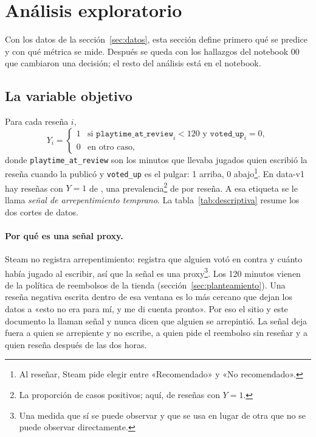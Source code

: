 \section{Análisis exploratorio}\label{sec:exploracion}

Con los datos de la sección~\ref{sec:datos}, esta sección define primero qué se predice y con qué
métrica se mide. Después se queda con los hallazgos del notebook 00 que cambiaron una decisión; el
resto del análisis está en el notebook.

\subsection{La variable objetivo}\label{sec:objetivo}\label{sec:objetivo-formula}

Para cada reseña $i$,
\[
  Y_i =
  \begin{cases}
    1 & \text{si } \texttt{playtime\_at\_review}_i < 120 \text{ y } \texttt{voted\_up}_i = 0,\\
    0 & \text{en otro caso,}
  \end{cases}
\]
donde \texttt{playtime\_at\_review} son los minutos que llevaba jugados quien escribió la reseña
cuando la publicó y \texttt{voted\_up} es el pulgar: 1 arriba, 0 abajo\footnote{Al reseñar, Steam
pide elegir entre «Recomendado» y «No recomendado».}. En data-v1 hay \cifraPositivosEntrenamiento{}
reseñas con $Y = 1$ de \cifraResenasEntrenamiento{}, una prevalencia\footnote{La proporción de
casos positivos; aquí, de reseñas con $Y = 1$.} de \cifraPrevalenciaEntrenamientoPorResena{} por
reseña. A esa etiqueta se le llama \emph{señal de arrepentimiento temprano}. La
tabla~\ref{tab:descriptiva} resume los dos cortes de datos.

\begin{table}[htbp]
  \centering\small
  
  \caption{Estadísticas descriptivas del corte de entrenamiento y del catálogo que sirve el sitio.
  El precio y la nota son de los juegos, no de las reseñas. Fuente: releases data-v1 y data-v3.}
  \label{tab:descriptiva}
\end{table}

\paragraph{Por qué es una señal proxy.}\label{sec:objetivo-proxy} Steam no registra
arrepentimiento: registra que alguien votó en contra y cuánto había jugado al escribir, así que la
señal es una proxy\footnote{Una medida que sí se puede observar y que se usa en lugar de otra que
no se puede observar directamente.}. Los 120 minutos vienen de la política de reembolsos de la
tienda (sección~\ref{sec:planteamiento}). Una reseña negativa escrita dentro de esa
ventana es lo más cercano que dejan los datos a «esto no era para mí, y me di cuenta pronto». Por
eso el sitio y este documento la llaman señal y nunca dicen que alguien se arrepintió. La señal deja
fuera a quien se arrepiente y no escribe, a quien pide el reembolso sin reseñar y a quien reseña
después de las dos horas.

